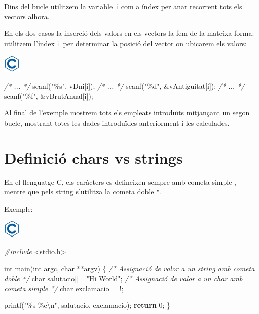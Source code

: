 \documentclass[
]{book}
\newenvironment{Shaded}{\begin{snugshade}}{\end{snugshade}}
\newcommand{\CharTok}[1]{\textcolor[rgb]{0.31,0.60,0.02}{#1}}
\newcommand{\CommentTok}[1]{\textcolor[rgb]{0.56,0.35,0.01}{\textit{#1}}}
\newcommand{\ControlFlowTok}[1]{\textcolor[rgb]{0.13,0.29,0.53}{\textbf{#1}}}
\newcommand{\DataTypeTok}[1]{\textcolor[rgb]{0.13,0.29,0.53}{#1}}
\newcommand{\DecValTok}[1]{\textcolor[rgb]{0.00,0.00,0.81}{#1}}
\newcommand{\ImportTok}[1]{#1}
\newcommand{\NormalTok}[1]{#1}
\newcommand{\PreprocessorTok}[1]{\textcolor[rgb]{0.56,0.35,0.01}{\textit{#1}}}
\newcommand{\SpecialCharTok}[1]{\textcolor[rgb]{0.00,0.00,0.00}{#1}}
\newcommand{\StringTok}[1]{\textcolor[rgb]{0.31,0.60,0.02}{#1}}
\begin{document}
Dins del bucle utilitzem la variable \texttt{i} com a índex per anar recorrent tots els vectors alhora.

En els dos casos la inserció dels valors en els vectors la fem de la mateixa forma: utilitzem l'índex \texttt{i} per determinar la posició del vector on ubicarem els valors:

\includegraphics{./img/c.png}

\begin{Shaded}
\begin{Highlighting}[]
\CommentTok{/* ... */}
\NormalTok{scanf(}\StringTok{"\%s"}\NormalTok{, vDni[i]);}
\CommentTok{/* ... */}
\NormalTok{scanf(}\StringTok{"\%d"}\NormalTok{, \&vAntiguitat[i]);}
\CommentTok{/* ... */}
\NormalTok{scanf(}\StringTok{"\%f"}\NormalTok{, \&vBrutAnual[i]);}
\end{Highlighting}
\end{Shaded}

Al final de l'exemple mostrem tots els empleats introduïts mitjançant un segon bucle, mostrant totes les dades introduïdes anteriorment i les calculades.

\hypertarget{definiciuxf3-chars-vs-strings}{%
\section{Definició chars vs strings}\label{definiciuxf3-chars-vs-strings}}

En el llenguatge C, els caràcters es defineixen sempre amb cometa simple \texttt{\textquotesingle{}}, mentre que pels string s'utilitza la cometa doble \texttt{"}.

Exemple:

\includegraphics{./img/c.png}

\begin{Shaded}
\begin{Highlighting}[]
\PreprocessorTok{\#include }\ImportTok{\textless{}stdio.h\textgreater{}}

\DataTypeTok{int}\NormalTok{ main(}\DataTypeTok{int}\NormalTok{ argc, }\DataTypeTok{char}\NormalTok{ **argv) \{}
    \CommentTok{/* Assignació de valor a un string amb cometa doble */}
    \DataTypeTok{char}\NormalTok{ salutacio[]= }\StringTok{"Hi World"}\NormalTok{;}
    \CommentTok{/* Assignació de valor a un char amb cometa simple */}
    \DataTypeTok{char}\NormalTok{ exclamacio = }\CharTok{\textquotesingle{}!\textquotesingle{}}\NormalTok{;}

\NormalTok{    printf(}\StringTok{"\%s \%c}\SpecialCharTok{\textbackslash{}n}\StringTok{"}\NormalTok{, salutacio, exclamacio);}
    \ControlFlowTok{return} \DecValTok{0}\NormalTok{;}
\NormalTok{\}}
\end{Highlighting}
\end{Shaded}
\end{document}
